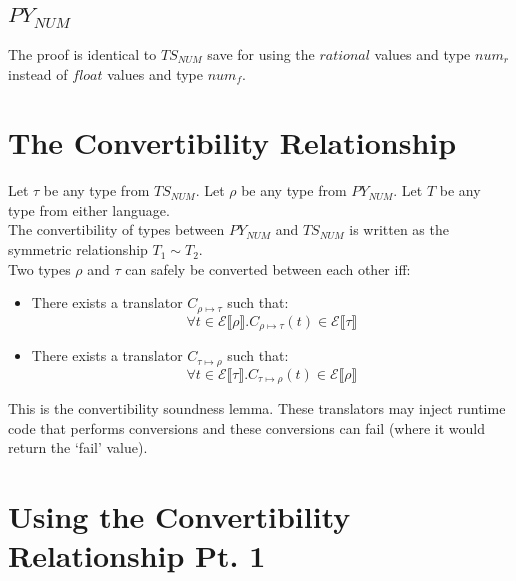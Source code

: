 \documentclass{article}
\newcommand{\denoteset}[2]{\mathcal{#1} \llbracket #2 \rrbracket}
\begin{document}
	\subsection{$PY_{NUM}$}
	
	The proof is identical to $TS_{NUM}$ save for using the $rational$ values and type $num_r$ instead of $float$ values and type $num_f$.

	\section{The Convertibility Relationship}
	
	Let $\tau$ be any type from $TS_{NUM}$. Let $\rho$ be any type from $PY_{NUM}$. Let $T$ be any type from either language.\\
	
	The convertibility of types between $PY_{NUM}$ and $TS_{NUM}$ is written as the symmetric relationship $T_1 \sim T_2$.\\
	
	Two types $\rho$ and $\tau$ can safely be converted between each other iff:
	\begin{itemize}
		\item There exists a translator $C_{\rho \mapsto \tau}$ such that:
		\[
			\forall t \in \denoteset{E}{\rho}. C_{\rho \mapsto \tau}(t) \in \denoteset{E}{\tau}
		\]
		\item There exists a translator $C_{\tau \mapsto \rho}$ such that:
		\[
			\forall t \in \denoteset{E}{\tau}. C_{\tau \mapsto \rho}(t) \in \denoteset{E}{\rho}
		\]
	\end{itemize}
	This is the convertibility soundness lemma. These translators may inject runtime code that performs conversions and these conversions can fail (where it would return the `fail' value).


\section{Using the Convertibility Relationship Pt. 1}

		
	\printbibliography[heading=bibintoc]
\end{document}
